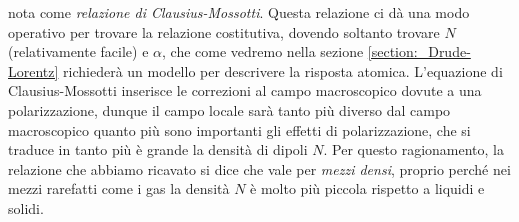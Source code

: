 nota come \textit{relazione di Clausius-Mossotti}. Questa relazione ci dà una modo operativo per trovare la relazione costitutiva, dovendo soltanto 
trovare $ N $ (relativamente facile) e $ \alpha $, che come vedremo nella sezione \ref{section:_Drude-Lorentz} richiederà un modello per descrivere 
la risposta atomica. L'equazione di Clausius-Mossotti inserisce le correzioni al campo macroscopico dovute a una polarizzazione, dunque il campo locale 
sarà tanto più diverso dal campo macroscopico quanto più sono importanti gli effetti di polarizzazione, che si traduce in tanto più è grande la 
densità di dipoli $ N $. Per questo ragionamento, la relazione che abbiamo ricavato si dice che vale per \textit{mezzi densi}, proprio perché nei mezzi 
rarefatti come i gas la densità $ N $ è molto più piccola rispetto a liquidi e solidi.

